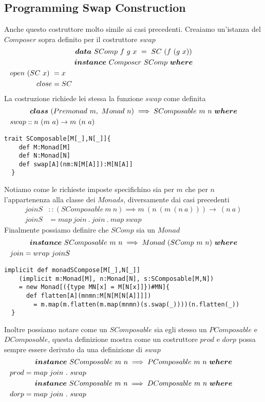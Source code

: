 \subsection{Programming Swap Construction}
\label{programming_swap_construction}
Anche questo costruttore molto simile ai casi precedenti.
Creaiamo un'istanza del $Composer$ sopra definito per il costruttore $swap$
\begin{align*}
  \classdef{\bm{data}\ SComp\ f\ g\ x\ =\ SC\ (f\ (g\ x))}
  \classdef{\bm{instance}\ Composer\ SComp\ \bm{where} }
  open\ (SC\ x)\ &= x\\
  close &= SC
\end{align*}
La costruzione richiede lei stessa la funzione $swap$ come definita
\begin{align*}
  \classdef{\bm{class}\ (Premonad\ m,\ Monad\ n) \implies SComposable\ m\ n\ \bm{where}}
  swap &:: n\ (m\ a) \to m\ (n\ a)
\end{align*}
\begin{lstlisting}[style=myScalastyle, caption=Swap Constructor]
  trait SComposable[M[_],N[_]]{
    def M:Monad[M]
    def N:Monad[N]
    def swap[A](nm:N[M[A]]):M[N[A]]
  }
\end{lstlisting}
Notiamo come le richieste imposte specifichino sia per $m$ che per $n$ l'appartenenza
alla classe dei $Monads$, diversamente dai casi precedenti
\begin{align*}
  joinS &:: (SComposable\ m\ n) \implies m\ (n\ (m\ (n\ a))) \to \ (n\ a)\\
  joinS &= map\ join\ .\ join\ .\ map\ swap
\end{align*}
Finalmente possiamo definire che $SComp$ sia un $Monad$
\begin{align*}
  \classdef{\bm{instance}\ SComposable\ m\ n \implies Monad\ (SComp\ m\ n)\ \bm{where}}
  join &= wrap\ joinS
\end{align*}
\begin{lstlisting}[style=myScalastyle, caption=SComposable is Monad]
  implicit def monadSCompose[M[_],N[_]]
    (implicit m:Monad[M], n:Monad[N], s:SComposable[M,N])
    = new Monad[({type MN[x] = M[N[x]]})#MN]{
      def flatten[A](mnmn:M[N[M[N[A]]]])
        = m.map(m.flatten(m.map(mnmn)(s.swap(_))))(n.flatten(_))
  }
  \end{lstlisting}
Inoltre possiamo notare come un $SComposable$ sia egli stesso un $PComposable$ e
$DComposable$, questa definizione mostra come un costruttore $prod$ e $dorp$
possa sempre essere derivato da una definizione di $swap$
\begin{align*}
  \classdef{\bm{instance}\ SComposable\ m\ n \implies PComposable\ m\ n\ \bm{where}}
  prod &= map\ join\ .\ swap\\
  \classdef{\bm{instance}\ SComposable\ m\ n \implies DComposable\ m\ n\ \bm{where}}
  dorp &= map\ join\ .\ swap\\
\end{align*}

